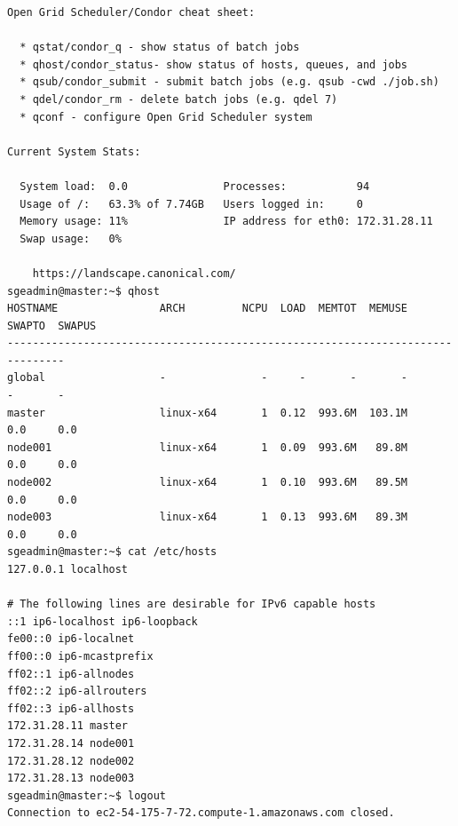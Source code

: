 \documentclass{article}
\begin{document}
\begin{lstlisting}[style=miniBash]
Open Grid Scheduler/Condor cheat sheet:

  * qstat/condor_q - show status of batch jobs
  * qhost/condor_status- show status of hosts, queues, and jobs
  * qsub/condor_submit - submit batch jobs (e.g. qsub -cwd ./job.sh)
  * qdel/condor_rm - delete batch jobs (e.g. qdel 7)
  * qconf - configure Open Grid Scheduler system

Current System Stats:

  System load:  0.0               Processes:           94
  Usage of /:   63.3% of 7.74GB   Users logged in:     0
  Memory usage: 11%               IP address for eth0: 172.31.28.11
  Swap usage:   0%

    https://landscape.canonical.com/
sgeadmin@master:~$ qhost
HOSTNAME                ARCH         NCPU  LOAD  MEMTOT  MEMUSE  SWAPTO  SWAPUS
-------------------------------------------------------------------------------
global                  -               -     -       -       -       -       -
master                  linux-x64       1  0.12  993.6M  103.1M     0.0     0.0
node001                 linux-x64       1  0.09  993.6M   89.8M     0.0     0.0
node002                 linux-x64       1  0.10  993.6M   89.5M     0.0     0.0
node003                 linux-x64       1  0.13  993.6M   89.3M     0.0     0.0
sgeadmin@master:~$ cat /etc/hosts
127.0.0.1 localhost

# The following lines are desirable for IPv6 capable hosts
::1 ip6-localhost ip6-loopback
fe00::0 ip6-localnet
ff00::0 ip6-mcastprefix
ff02::1 ip6-allnodes
ff02::2 ip6-allrouters
ff02::3 ip6-allhosts
172.31.28.11 master
172.31.28.14 node001
172.31.28.12 node002
172.31.28.13 node003
sgeadmin@master:~$ logout
Connection to ec2-54-175-7-72.compute-1.amazonaws.com closed.
\end{lstlisting}
\end{document}
